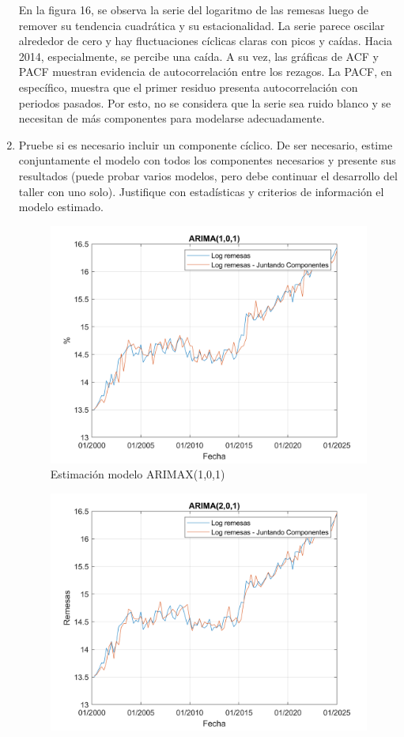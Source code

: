 \documentclass{article}
\theoremstyle{remark}
\theoremstyle{definition}
\begin{document}
\begin{enumerate}[label=\emph{\alph*})]
\begin{tcolorbox}[title=Soluci\'on 3.d]
             En la figura 16, se observa la serie del logaritmo de las remesas luego de  remover su tendencia cuadrática y su estacionalidad. La serie parece oscilar alrededor de cero y hay fluctuaciones cíclicas claras con picos y caídas. Hacia 2014, especialmente, se percibe una caída. A su vez, las gráficas de ACF y PACF muestran evidencia de autocorrelación entre los rezagos. La PACF, en específico, muestra que el primer residuo presenta autocorrelación con periodos pasados. Por esto, no se considera que la serie sea ruido blanco y se necesitan de más componentes para modelarse adecuadamente. 
        \end{tcolorbox}
    

    \item {Pruebe si es necesario incluir un componente c\'iclico. De ser necesario, estime conjuntamente el modelo con todos los componentes necesarios y presente sus resultados (puede probar varios modelos, pero debe continuar el desarrollo del taller con uno solo). Justifique con estad\'isticas y criterios de informaci\'on el modelo estimado.}
        \begin{tcolorbox}[title=Soluci\'on 3.e]
            \begin{figure}[H]
                \centering
                \includegraphics[width=0.5\linewidth]{docs/Arima_1_0_1.png}
                \caption{Estimación modelo ARIMAX(1,0,1)}
                \label{fig:enter-label}
            \end{figure}
            \begin{figure}[H]
                \centering
                \includegraphics[width=0.5\linewidth]{docs/Arima_1_0_2.png}

\end{figure}
\end{tcolorbox}
\end{enumerate}
\end{document}
